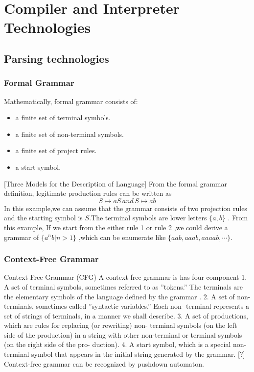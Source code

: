 \chapter{Compiler and Interpreter Technologies}
\section{Parsing technologies}
\subsection{Formal Grammar}

Mathematically, formal grammar consists of:
\begin{itemize}
\item a finite set of terminal symbols.
\item a finite set of non-terminal symbols.
\item a finite set of project rules.
\item a start symbol.
\end{itemize} \cite{aho1986compilers}
[Three Models for the Description of Language]
From the formal grammar definition, legitimate production rules can be written as 
 \[ S \mapsto aS  \,and \, S \mapsto ab \]
In this example,we can assume that the grammar consists of two projection rules and the starting symbol is $ S $.The terminal symbols are lower letters $ \{a ,b\} $ . From this example, If we start from the either rule 1 or rule 2 ,we could derive a  grammar of $ \{ a^n b | n>1  \}$ ,which can be enumerate like $ \{aab,aaab,aaaab,\cdots \} $.




\subsection{Context-Free Grammar}
Context-Free Grammar (CFG)
A context-free grammar is has four component
1. A set of terminal symbols, sometimes referred to as ”tokens.” The
terminals are the elementary symbols of the language defined by the
grammar .
2. A set of non-terminals, sometimes called ”syntactic variables.” Each
non- terminal represents a set of strings of terminals, in a manner we
shall describe.
3. A set of productions, which are rules for replacing (or rewriting) non-
terminal symbols (on the left side of the production) in a string with
other non-terminal or terminal symbols (on the right side of the pro-
duction).
4. A start symbol, which is a special non-terminal symbol that appears
in the initial string generated by the grammar.
[?] Context-free grammar can be recognized by pushdown automaton.





